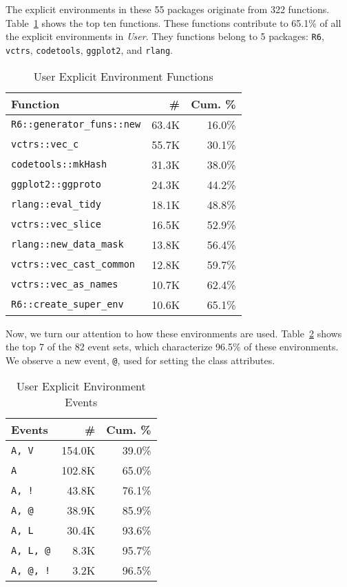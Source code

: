 \documentclass[10pt,review,sigplan,authorversion=true]{acmart}
\newcommand{\code}[1]{\lstinline |#1|\xspace}
\begin{document}
The explicit environments in these 55 packages originate from 322 functions.
Table~\ref{table:user_explicit_fun} shows the top ten functions. These functions
contribute to 65.1\% of all the explicit environments in \emph{User}. They
functions belong to 5 packages: \code{R6}, \code{vctrs}, \code{codetools},
\code{ggplot2}, and \code{rlang}.

\begin{table}[!h]
  \small
  \caption{User Explicit Environment Functions} \label{table:user_explicit_fun}
  \centering
  \begin{tabular}{lrr}
    \toprule
    \textbf{Function}&\textbf{\#}&\textbf{Cum. \%}\\
    \midrule
    \code{R6::generator_funs::new}&63.4K&16.0\%\\
    \code{vctrs::vec_c}&55.7K&30.1\%\\
    \code{codetools::mkHash}&31.3K&38.0\%\\
    \code{ggplot2::ggproto}&24.3K&44.2\%\\
    \code{rlang::eval_tidy}&18.1K&48.8\%\\
    \code{vctrs::vec_slice}&16.5K&52.9\%\\
    \code{rlang::new_data_mask}&13.8K&56.4\%\\
    \code{vctrs::vec_cast_common}&12.8K&59.7\%\\
    \code{vctrs::vec_as_names}&10.7K&62.4\%\\
    \code{R6::create_super_env}&10.6K&65.1\%\\
    \bottomrule
  \end{tabular}
\end{table}

Now, we turn our attention to how these environments are used.
Table~\ref{table:user_explicit_env_seq} shows the top 7 of the 82 event sets,
which characterize 96.5\% of these environments. We observe a new event,
\texttt{@}, used for setting the class attributes.

\begin{table}[!h]
  \small
  \caption{User Explicit Environment Events} \label{table:user_explicit_env_seq}
  \centering
  \begin{tabular}{lrr}
    \toprule
    \textbf{Events}&\textbf{\#}&\textbf{Cum. \%}\\
    \midrule
    \texttt{A, V}&154.0K&39.0\%\\
    \texttt{A}&102.8K&65.0\%\\
    \texttt{A, !}&43.8K&76.1\%\\
    \texttt{A, @}&38.9K&85.9\%\\
    \texttt{A, L}&30.4K&93.6\%\\
    \texttt{A, L, @}&8.3K&95.7\%\\
    \texttt{A, @, !}&3.2K&96.5\%\\
    \bottomrule
  \end{tabular}
\end{table}
\end{document}
